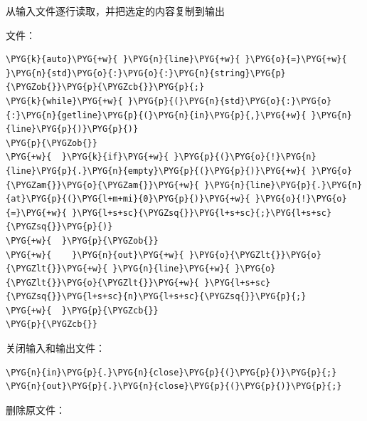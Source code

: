 
从输入文件逐行读取，并把选定的内容复制到输出



文件：



\begin{codeblockbg}
\begin{Verbatim}[commandchars=\\\{\},breaklines=true,breakanywhere=true,fontsize=\codefont,xleftmargin=17bp]
\PYG{k}{auto}\PYG{+w}{ }\PYG{n}{line}\PYG{+w}{ }\PYG{o}{=}\PYG{+w}{ }\PYG{n}{std}\PYG{o}{:}\PYG{o}{:}\PYG{n}{string}\PYG{p}{\PYGZob{}}\PYG{p}{\PYGZcb{}}\PYG{p}{;}
\PYG{k}{while}\PYG{+w}{ }\PYG{p}{(}\PYG{n}{std}\PYG{o}{:}\PYG{o}{:}\PYG{n}{getline}\PYG{p}{(}\PYG{n}{in}\PYG{p}{,}\PYG{+w}{ }\PYG{n}{line}\PYG{p}{)}\PYG{p}{)}
\PYG{p}{\PYGZob{}}
\PYG{+w}{  }\PYG{k}{if}\PYG{+w}{ }\PYG{p}{(}\PYG{o}{!}\PYG{n}{line}\PYG{p}{.}\PYG{n}{empty}\PYG{p}{(}\PYG{p}{)}\PYG{+w}{ }\PYG{o}{\PYGZam{}}\PYG{o}{\PYGZam{}}\PYG{+w}{ }\PYG{n}{line}\PYG{p}{.}\PYG{n}{at}\PYG{p}{(}\PYG{l+m+mi}{0}\PYG{p}{)}\PYG{+w}{ }\PYG{o}{!}\PYG{o}{=}\PYG{+w}{ }\PYG{l+s+sc}{\PYGZsq{}}\PYG{l+s+sc}{;}\PYG{l+s+sc}{\PYGZsq{}}\PYG{p}{)}
\PYG{+w}{  }\PYG{p}{\PYGZob{}}
\PYG{+w}{    }\PYG{n}{out}\PYG{+w}{ }\PYG{o}{\PYGZlt{}}\PYG{o}{\PYGZlt{}}\PYG{+w}{ }\PYG{n}{line}\PYG{+w}{ }\PYG{o}{\PYGZlt{}}\PYG{o}{\PYGZlt{}}\PYG{+w}{ }\PYG{l+s+sc}{\PYGZsq{}}\PYG{l+s+sc}{n}\PYG{l+s+sc}{\PYGZsq{}}\PYG{p}{;}
\PYG{+w}{  }\PYG{p}{\PYGZcb{}}
\PYG{p}{\PYGZcb{}}
\end{Verbatim}
\end{codeblockbg}



关闭输入和输出文件：



\begin{codeblockbg}
\begin{Verbatim}[commandchars=\\\{\},breaklines=true,breakanywhere=true,fontsize=\codefont,xleftmargin=17bp]
\PYG{n}{in}\PYG{p}{.}\PYG{n}{close}\PYG{p}{(}\PYG{p}{)}\PYG{p}{;}
\PYG{n}{out}\PYG{p}{.}\PYG{n}{close}\PYG{p}{(}\PYG{p}{)}\PYG{p}{;}
\end{Verbatim}
\end{codeblockbg}



删除原文件：



